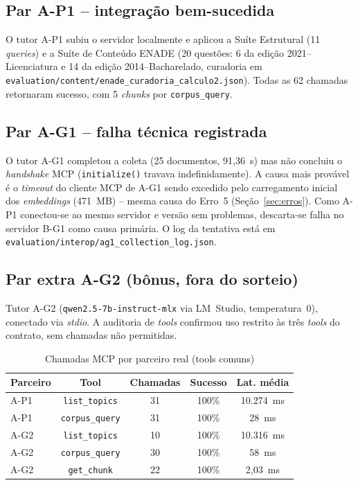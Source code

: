 \documentclass[12pt]{article}
\begin{document}
\subsection{Par A-P1 -- integração bem-sucedida}

O tutor A-P1 subiu o servidor localmente e aplicou a Suíte Estrutural (11 \textit{queries}) e a
Suíte de Conteúdo ENADE (20 questões: 6 da edição 2021--Licenciatura e 14 da edição
2014--Bacharelado, curadoria em \texttt{evaluation/content/enade\_curadoria\_calculo2.json}).
Todas as 62 chamadas retornaram sucesso, com 5 \textit{chunks} por \texttt{corpus\_query}.

\subsection{Par A-G1 -- falha técnica registrada}

O tutor A-G1 completou a coleta (25 documentos, 91,36~s) mas não concluiu o \textit{handshake} MCP
(\texttt{initialize()} travava indefinidamente). A causa mais provável é o \textit{timeout} do
cliente MCP de A-G1 sendo excedido pelo carregamento inicial dos \textit{embeddings} (471~MB) --
mesma causa do Erro~5 (Seção~\ref{sec:erros}). Como A-P1 conectou-se ao mesmo servidor e versão
sem problemas, descarta-se falha no servidor B-G1 como causa primária. O log da tentativa está em
\texttt{evaluation/interop/ag1\_collection\_log.json}.

\subsection{Par extra A-G2 (bônus, fora do sorteio)}

Tutor A-G2 (\texttt{qwen2.5-7b-instruct-mlx} via LM~Studio, temperatura~0), conectado via
\textit{stdio}. A auditoria de \textit{tools} confirmou uso restrito às três \textit{tools} do
contrato, sem chamadas não permitidas.

\begin{table}[h]
\centering
\caption{Chamadas MCP por parceiro real (tools comuns)}
\label{tab:interop}
\small
\begin{tabularx}{\linewidth}{l c c c c}
\toprule
\textbf{Parceiro} & \textbf{Tool} & \textbf{Chamadas} & \textbf{Sucesso} & \textbf{Lat. média} \\
\midrule
A-P1 & \texttt{list\_topics}  & 31 & 100\% & 10.274~ms \\
A-P1 & \texttt{corpus\_query} & 31 & 100\% & 28~ms \\
A-G2 & \texttt{list\_topics}  & 10 & 100\% & 10.316~ms \\
A-G2 & \texttt{corpus\_query} & 30 & 100\% & 58~ms \\
A-G2 & \texttt{get\_chunk}    & 22 & 100\% & 2,03~ms \\
\bottomrule
\end{tabularx}
\end{table}
\end{document}
